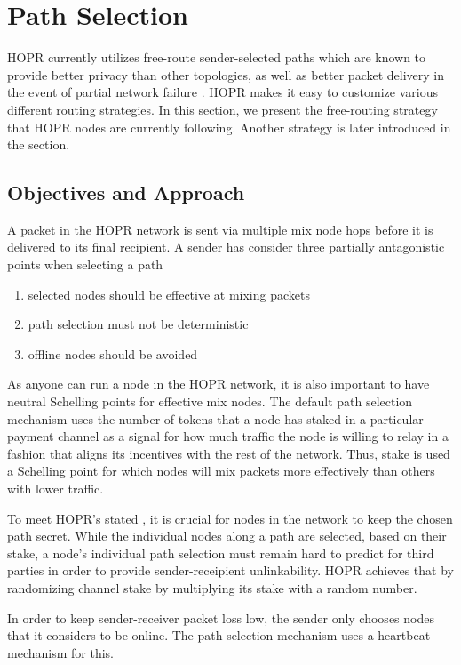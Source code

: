 \section{Path Selection}
\label{sec:path-selection}
HOPR currently utilizes free-route sender-selected paths which are known to provide better privacy than other topologies, as well as better packet delivery in the event of partial network failure \cite{Dingledine2004SynchronousBF}. HOPR makes it easy to customize various different routing strategies. In this section, we present the free-routing strategy that HOPR nodes are currently following. Another strategy is later introduced in the  section.

\subsection{Objectives and Approach}
A packet in the HOPR network is sent via multiple mix node hops before it is delivered to its final recipient. A sender has consider three partially antagonistic points when selecting a path

\begin{enumerate}
    \item selected nodes should be effective at mixing packets
    \item path selection must not be deterministic
    \item offline nodes should be avoided
\end{enumerate}

As anyone can run a node in the HOPR network, it is also important to have neutral Schelling points for effective mix nodes. The default path selection mechanism uses the number of tokens that a node has staked in a particular payment channel as a signal for how much traffic the node is willing to relay in a fashion that aligns its incentives with the rest of the network. Thus, stake is used a Schelling point for which nodes will mix packets more effectively than others with lower traffic.

To meet HOPR's stated , it is crucial for nodes in the network to keep the chosen path secret. While the individual nodes along a path are selected, based on their stake, a node's individual path selection must remain hard to predict for third parties in order to provide sender-receipient unlinkability. HOPR achieves that by randomizing channel stake by multiplying its stake with a random number.

In order to keep sender-receiver packet loss low, the sender only chooses nodes that it considers to be online. The path selection mechanism uses a heartbeat mechanism for this.




